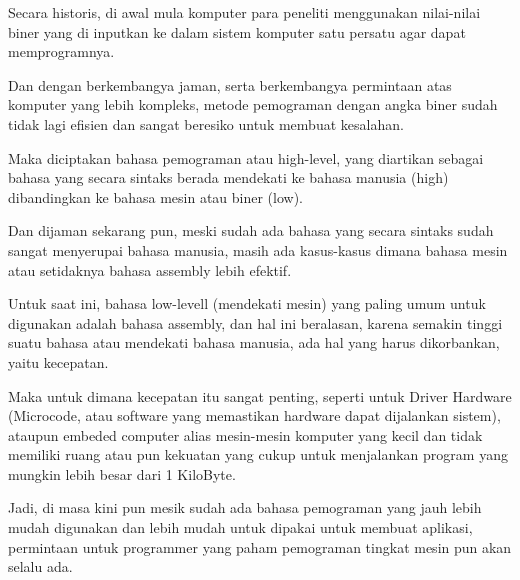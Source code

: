 Secara historis, di awal mula komputer para peneliti menggunakan nilai-nilai biner
yang di inputkan ke dalam sistem komputer satu persatu agar dapat memprogramnya.

Dan dengan berkembangya jaman, serta berkembangya permintaan atas komputer yang
lebih kompleks, metode pemograman dengan angka biner sudah tidak lagi efisien
dan sangat beresiko untuk membuat kesalahan.

Maka diciptakan bahasa pemograman atau high-level, yang diartikan sebagai bahasa
yang secara sintaks berada mendekati ke bahasa manusia (high) dibandingkan ke
bahasa mesin atau biner (low).

Dan dijaman sekarang pun, meski sudah ada bahasa yang secara sintaks sudah sangat
menyerupai bahasa manusia, masih ada kasus-kasus dimana bahasa mesin atau setidaknya
bahasa assembly lebih efektif.

Untuk saat ini, bahasa low-levell (mendekati mesin) yang paling umum untuk digunakan
adalah bahasa assembly, dan hal ini beralasan, karena semakin tinggi suatu bahasa
atau mendekati bahasa manusia, ada hal yang harus dikorbankan, yaitu kecepatan.

Maka untuk dimana kecepatan itu sangat penting, seperti untuk Driver Hardware
(Microcode, atau software yang memastikan hardware dapat dijalankan sistem), ataupun
embeded computer alias mesin-mesin komputer yang kecil dan tidak memiliki ruang
atau pun kekuatan yang cukup untuk menjalankan program yang mungkin lebih besar dari
1 KiloByte.

Jadi, di masa kini pun mesik sudah ada bahasa pemograman yang jauh lebih mudah
digunakan dan lebih mudah untuk dipakai untuk membuat aplikasi, permintaan untuk
programmer yang paham pemograman tingkat mesin pun akan selalu ada.
